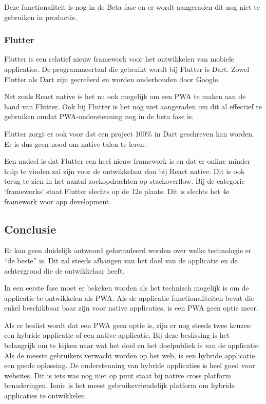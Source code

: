 			Deze functionaliteit is nog in de Beta fase en er wordt aangeraden dit nog niet te gebruiken in productie.
			\autocite{Expo2020}


	\subsubsection{Flutter}
		Flutter \autocite{Flutter2020} is een relatief nieuw framework voor het ontwikkelen van mobiele applicaties. De programmeertaal die gebruikt wordt bij Flutter is Dart. Zowel Flutter als Dart zijn gecreëerd en worden onderhouden door Google. 
		
		Net zoals React native is het nu ook mogelijk om een PWA te maken aan de hand van Flutter. Ook bij Flutter is het nog niet aangeraden om dit al effectief te gebruiken omdat PWA-ondersteuning nog in de beta fase is. 
		
		Flutter zorgt er ook voor dat een project 100\% in Dart geschreven kan worden. Er is dus geen nood om native talen te leren. 
		
		Een nadeel is dat Flutter een heel nieuw framework is en dat er online minder hulp te vinden zal zijn voor de ontwikkelaar dan bij React native. Dit is ook terug te zien in het aantal zoekopdrachten op stackoverflow. Bij de categorie ‘frameworks’ staat Flutter slechts op de 12e plaats. Dit is slechts het 4e framework voor app development.
		\autocite{StackOverflow2020}
		
\subsection{Conclusie}

Er kan geen duidelijk antwoord geformuleerd worden over welke technologie er “de beste” is. Dit zal steeds afhangen van het doel van de applicatie en de achtergrond die de ontwikkelaar heeft.


In een eerste fase moet er  bekeken worden als het technisch mogelijk is om de applicatie te ontwikkelen als PWA. Als de applicatie functionaliteiten bevat die enkel beschikbaar baar zijn voor native applicaties, is een PWA geen optie meer.

Als er beslist wordt dat een PWA geen optie is, zijn er nog steeds twee keuzes: een hybride applicatie of een native applicatie. Bij deze beslissing is het belangrijk om te kijken naar wat het doel en het doelpubliek is van de applicatie. Als de meeste gebruikers verwacht worden op het web, is een hybride applicatie een goede oplossing. De ondersteuning van hybride applicaties is heel goed voor websites. Dit is iets was nog niet op punt staat bij native cross platform benaderingen. Ionic is het meest gebruiksvriendelijk platform om hybride applicaties te ontwikkelen.

